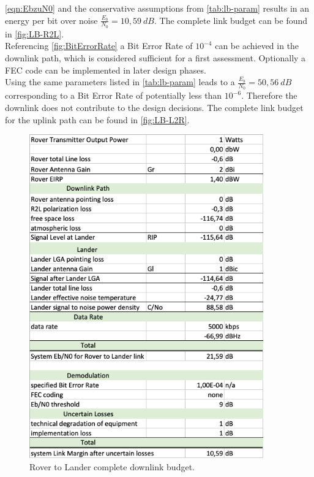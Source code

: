 \autoref{eqn:EbzuN0} and the conservative assumptions from \autoref{tab:lb-param} results in an energy per bit over noise $\frac{{E}_{b}}{{N}_{0}} = 10,59\ dB$. The complete link budget can be found in \autoref{fig:LB-R2L}. \\
Referencing \autoref{fig:BitErrorRate} a Bit Error Rate of $10^{-4}$ can be achieved in the downlink path, which is considered sufficient for a first assessment. Optionally a FEC code can be implemented in later design phases.\\

Using the same parameters listed in \autoref{tab:lb-param} leads to a $\frac{{E}_{b}}{{N}_{0}} = 50,56\ dB$ corresponding to a Bit Error Rate of potentially less than $10^{-6}$. Therefore the downlink does not contribute to the design decisions. The complete link budget for the uplink path can be found in \autoref{fig:LB-L2R}.

\begin{figure}[h]
	\centering
  		\includegraphics[width=0.9\textwidth]{Media/LB-RovertoLander.png}
  \caption{Rover to Lander complete downlink budget.}
  \label{fig:LB-R2L}
\end{figure}


